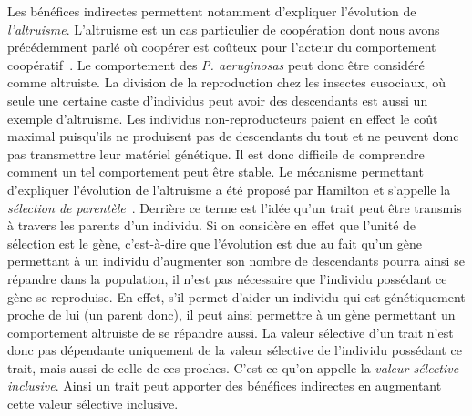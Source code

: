 		Les bénéfices indirectes permettent notamment d'expliquer l'évolution de \emph{l'altruisme}. L'altruisme est un cas particulier de coopération dont nous avons précédemment parlé où coopérer est coûteux pour l'acteur du comportement coopératif~\parencite{Hamilton1964, West2007a}. Le comportement des \emph{P. aeruginosas} peut donc être considéré comme altruiste. La division de la reproduction chez les insectes eusociaux, où seule une certaine caste d'individus peut avoir des descendants est aussi un exemple d'altruisme. Les individus non-reproducteurs paient en effect le coût maximal puisqu'ils ne produisent pas de descendants du tout et ne peuvent donc pas transmettre leur matériel génétique. Il est donc difficile de comprendre comment un tel comportement peut être stable. Le mécanisme permettant d'expliquer l'évolution de l'altruisme a été proposé par Hamilton et s'appelle la \emph{sélection de parentèle}~\parencite{Hamilton1964}. Derrière ce terme est l'idée qu'un trait peut être transmis à travers les parents d'un individu. Si on considère en effet que l'unité de sélection est le gène, c'est-à-dire que l'évolution est due au fait qu'un gène permettant à un individu d'augmenter son nombre de descendants pourra ainsi se répandre dans la population, il n'est pas nécessaire que l'individu possédant ce gène se reproduise. En effet, s'il permet d'aider un individu qui est génétiquement proche de lui (un parent donc), il peut ainsi permettre à un gène permettant un comportement altruiste de se répandre aussi. La valeur sélective d'un trait n'est donc pas dépendante uniquement de la valeur sélective de l'individu possédant ce trait, mais aussi de celle de ces proches. C'est ce qu'on appelle la \emph{valeur sélective inclusive}. Ainsi un trait peut apporter des bénéfices indirectes en augmentant cette valeur sélective inclusive.

